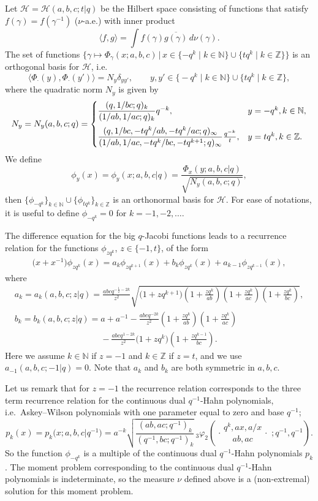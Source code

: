 \documentclass[pdftex]{sigma}
\numberwithin{equation}{section}
\numberwithin{theorem}{section}
\numberwithin{proposition}{section}
\numberwithin{lemma}{section}
\numberwithin{corollary}{section}
\numberwithin{definition}{section}
\numberwithin{example}{section}
\numberwithin{remark}{section}
\numberwithin{note}{section}
\newcommand{\N}{\mathbb N}
\newcommand{\Z}{\mathbb Z}
\newcommand{\rphis}[5]{\,_{#1}\varphi_{#2} \left( \genfrac{.}{.}{0pt}{}{#3}{#4}
\ ;#5 \right)}
\begin{document}
Let $\mathcal H=\mathcal H(a,b,c;t|q)$ be the Hilbert space consisting of functions that satisfy $f(\gamma)=f(\gamma^{-1})$ ($\nu$-a.e.) with inner product
\[
\langle f ,g \rangle = \int f(\gamma) \overline{g(\gamma)}\, d\nu(\gamma).
\]
The set of functions $\{\gamma \mapsto \Phi_\gamma(x;a,b,c)\, | \, x \in \{-q^k\mid k \in \N\}\cup\{tq^k\mid k \in \Z \}\}$ is an orthogonal basis for $\mathcal H$, i.e.
\[
\langle \Phi_\cdot(y), \Phi_\cdot(y') \rangle = N_y \delta_{yy'}, \qquad y,y' \in \big\{{-}q^k\mid k \in \N\big\}\cup\big\{tq^k \mid k \in \Z\big\},
\]
where the quadratic norm $N_y$ is given by
\[
N_y =N_y(a,b,c;q)= \begin{cases}
 \dfrac{ (q,1/bc;q)_k }{(1/ab,1/ac;q)_k}q^{-k}, & y=-q^k, k \in \N ,\vspace{2mm}\\
 \dfrac{ (q,1/bc,-tq^k/ab, -tq^k/ac;q)_\infty }{ (1/ab,1/ac,-tq^k/bc, -tq^{k+1};q)_\infty }\frac{q^{-k}}{t}, & y=tq^k, k \in \Z.
\end{cases}
\]
We def\/ine
\[
\phi_y(x)=\phi_y(x;a,b,c|q) = \frac{\Phi_x(y;a,b,c|q)}{\sqrt{N_y(a,b,c;q)}},
\]
then $\{ \phi_{-q^k} \}_{k \in \N} \cup \{\phi_{tq^k} \}_{k \in \Z}$ is an orthonormal basis for $\mathcal H$. For ease of notations, it is useful to def\/ine $\phi_{-q^k}=0$ for $k=-1,-2,\ldots$.

The dif\/ference equation for the big $q$-Jacobi functions leads to a recurrence relation for the functions $\phi_{zq^k}$, $z\in\{-1,t\}$, of the form
\begin{gather} \label{eq:3termrecphi}
\big(x+x^{-1}\big)\phi_{zq^k}(x) = a_k \phi_{zq^{k+1}}(x) + b_k \phi_{zq^k}(x) + a_{k-1}\phi_{zq^{k-1}}(x),
\end{gather}
where
\begin{gather*}
a_k =a_k(a,b,c;z|q)=  \frac{ abcq^{-\frac12-2k} }{z^2} \sqrt{ \big(1+ zq^{k+1} \big) \left(1+\frac{ zq^k}{ab} \right) \left(1+\frac{zq^k}{ac} \right) \left(1+\frac{zq^k}{bc} \right) },\\
b_k =b_k(a,b,c;z|q)=  a+a^{-1} -\frac{abcq^{-2k}}{z^2}\left( 1+ \frac{zq^k}{ab} \right) \left( 1+ \frac{zq^k}{ac} \right)\\
\phantom{b_k =b_k(a,b,c;z|q)=}{}  -\frac{abcq^{1-2k}}{z^2} \big( 1+zq^k \big) \left( 1+\frac{zq^{k-1}}{bc} \right).
\end{gather*}
Here we assume $k \in \N$ if $z=-1$ and $k \in \Z$ if $z=t$, and we use $a_{-1}(a,b,c;-1|q)=0$. Note that $a_k$ and $b_k$ are both symmetric in $a,b,c$.

Let us remark that for $z=-1$ the recurrence relation corresponds to the three term recurrence relation for the continuous dual $q^{-1}$-Hahn polynomials, i.e.~Askey--Wilson polynomials with one parameter equal to zero and base $q^{-1}$;
\[
p_k(x)=p_k\big(x;a,b,c|q^{-1}\big) = a^{-k} \sqrt{ \frac{(ab,ac;q^{-1})_k}{(q^{-1}, bc;q^{-1})_k} } \rphis{3}{2}{q^{k}, ax, a/x}{ab, ac}{q^{-1}, q^{-1}}.
\]
So the function $\phi_{-q^k}$ is a multiple of the continuous dual $q^{-1}$-Hahn polynomials $p_k$. The moment problem corresponding to the continuous dual $q^{-1}$-Hahn polynomials is indeterminate, so the measure $\nu$ def\/ined above is a (non-extremal) solution for this moment problem.
\end{document}
